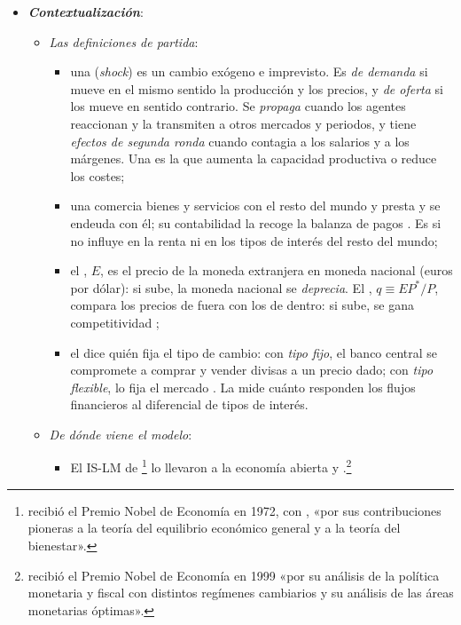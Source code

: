 \documentclass[11pt]{article}
\begin{document}
\begin{itemize}
\item \textbf{\emph{Contextualización}}:
  \begin{itemize}
  \item \emph{Las definiciones de partida}:
    \begin{itemize}
    \item una  (\emph{shock}) es un cambio exógeno e imprevisto. Es \emph{de demanda} si mueve en el mismo sentido la producción y los precios, y \emph{de oferta} si los mueve en sentido contrario. Se \emph{propaga} cuando los agentes reaccionan y la transmiten a otros mercados y periodos, y tiene \emph{efectos de segunda ronda} cuando contagia a los salarios y a los márgenes. Una  es la que aumenta la capacidad productiva o reduce los costes;
    \item una  comercia bienes y servicios con el resto del mundo y presta y se endeuda con él; su contabilidad la recoge la balanza de pagos . Es  si no influye en la renta ni en los tipos de interés del resto del mundo;
    \item el , $E$, es el precio de la moneda extranjera en moneda nacional (euros por dólar): si sube, la moneda nacional se \emph{deprecia}. El , $q\equiv EP^*/P$, compara los precios de fuera con los de dentro: si sube, se gana competitividad ;
    \item el  dice quién fija el tipo de cambio: con \emph{tipo fijo}, el banco central se compromete a comprar y vender divisas a un precio dado; con \emph{tipo flexible}, lo fija el mercado . La  mide cuánto responden los flujos financieros al diferencial de tipos de interés.
    \end{itemize}
  \item \emph{De dónde viene el modelo}:
    \begin{itemize}
    \item El IS-LM de \footnote{ recibió el Premio Nobel de Economía en 1972, con , «por sus contribuciones pioneras a la teoría del equilibrio económico general y a la teoría del bienestar»\nocite{Nobel1972HicksArrow}.}  lo llevaron a la economía abierta \textcite{Fleming1962Domestic} y \textcite{Mundell1963Capital}.\footnote{ recibió el Premio Nobel de Economía en 1999 «por su análisis de la política monetaria y fiscal con distintos regímenes cambiarios y su análisis de las áreas monetarias óptimas»\nocite{Nobel1999Mundell}.}

\end{itemize}
\end{itemize}
\end{itemize}
\end{document}
